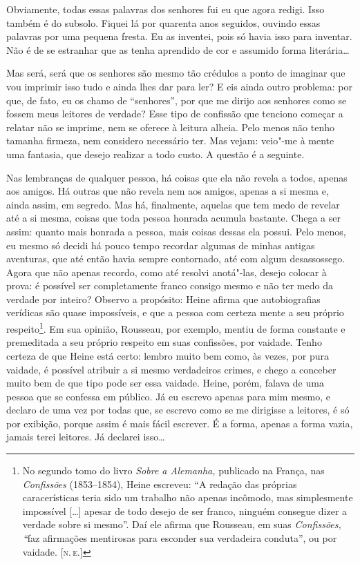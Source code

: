 Obviamente, todas essas palavras dos senhores fui eu que agora redigi.
Isso também é do subsolo. Fiquei lá por quarenta anos seguidos, ouvindo
essas palavras por uma pequena fresta. Eu as inventei, pois só havia
isso para inventar. Não é de se estranhar que as tenha aprendido de cor
e assumido forma literária\ldots{}

Mas será, será que os senhores são mesmo tão crédulos a ponto de
imaginar que vou imprimir isso tudo e ainda lhes dar para ler? E eis
ainda outro problema: por que, de fato, eu os chamo de ``senhores'', por
que me dirijo aos senhores como se fossem meus leitores de verdade? Esse
tipo de confissão que tenciono começar a relatar não se imprime, nem se
oferece à leitura alheia. Pelo menos não tenho tamanha firmeza, nem
considero necessário ter. Mas vejam: veio"-me à mente uma fantasia, que
desejo realizar a todo custo. A questão é a seguinte.

Nas lembranças de qualquer pessoa, há coisas que ela não revela a todos,
apenas aos amigos. Há outras que não revela nem aos amigos, apenas a si
mesma e, ainda assim, em segredo. Mas há, finalmente, aquelas que tem
medo de revelar até a si mesma, coisas que toda pessoa honrada acumula
bastante. Chega a ser assim: quanto mais honrada a pessoa, mais coisas
dessas ela possui. Pelo menos, eu mesmo só decidi há pouco tempo
recordar algumas de minhas antigas aventuras, que até então havia sempre
contornado, até com algum desassossego. Agora que não apenas recordo,
como até resolvi anotá"-las, desejo colocar à prova: é possível ser
completamente franco consigo mesmo e não ter medo da verdade por
inteiro? Observo a propósito: Heine afirma que autobiografias verídicas
são quase impossíveis, e que a pessoa com certeza mente a seu próprio
respeito\footnote{No segundo tomo do livro \emph{Sobre a Alemanha,}
  publicado na França, nas \emph{Confissões} (1853--1854), Heine
  escreveu: ``A redação das próprias caracerísticas teria sido um
  trabalho não apenas incômodo, mas simplesmente impossível
  {[}\ldots{}{]} apesar de todo desejo de ser franco, ninguém consegue
  dizer a verdade sobre si mesmo''. Daí ele afirma que Rousseau, em suas
  \emph{Confissões, ``}faz afirmações mentirosas para esconder sua
  verdadeira conduta'', ou por vaidade. {[}\textsc{n.\,e.}{]}}. Em sua opinião,
Rousseau, por exemplo, mentiu de forma constante e premeditada a seu
próprio respeito em suas confissões, por vaidade. Tenho certeza de que
Heine está certo: lembro muito bem como, às vezes, por pura vaidade, é
possível atribuir a si mesmo verdadeiros crimes, e chego a conceber
muito bem de que tipo pode ser essa vaidade. Heine, porém, falava de uma
pessoa que se confessa em público. Já eu escrevo apenas para mim mesmo,
e declaro de uma vez por todas que, se escrevo como se me dirigisse a
leitores, é só por exibição, porque assim é mais fácil escrever. É a
forma, apenas a forma vazia, jamais terei leitores. Já declarei isso\ldots{}


